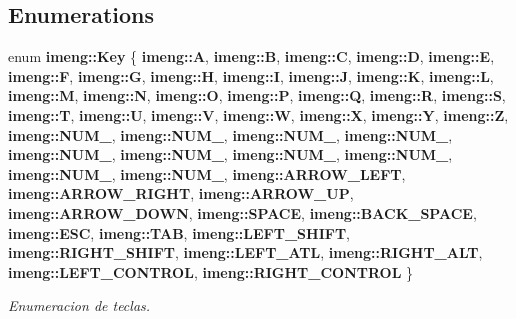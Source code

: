 \subsection*{Enumerations}
\begin{DoxyCompactItemize}
\item 
enum \textbf{ imeng\+::\+Key} \{ \newline
\textbf{ imeng\+::A}, 
\textbf{ imeng\+::B}, 
\textbf{ imeng\+::C}, 
\textbf{ imeng\+::D}, 
\newline
\textbf{ imeng\+::E}, 
\textbf{ imeng\+::F}, 
\textbf{ imeng\+::G}, 
\textbf{ imeng\+::H}, 
\newline
\textbf{ imeng\+::I}, 
\textbf{ imeng\+::J}, 
\textbf{ imeng\+::K}, 
\textbf{ imeng\+::L}, 
\newline
\textbf{ imeng\+::M}, 
\textbf{ imeng\+::N}, 
\textbf{ imeng\+::O}, 
\textbf{ imeng\+::P}, 
\newline
\textbf{ imeng\+::Q}, 
\textbf{ imeng\+::R}, 
\textbf{ imeng\+::S}, 
\textbf{ imeng\+::T}, 
\newline
\textbf{ imeng\+::U}, 
\textbf{ imeng\+::V}, 
\textbf{ imeng\+::W}, 
\textbf{ imeng\+::X}, 
\newline
\textbf{ imeng\+::Y}, 
\textbf{ imeng\+::Z}, 
\textbf{ imeng\+::\+N\+U\+M\+\_}, 
\textbf{ imeng\+::\+N\+U\+M\+\_}, 
\newline
\textbf{ imeng\+::\+N\+U\+M\+\_}, 
\textbf{ imeng\+::\+N\+U\+M\+\_}, 
\textbf{ imeng\+::\+N\+U\+M\+\_}, 
\textbf{ imeng\+::\+N\+U\+M\+\_}, 
\newline
\textbf{ imeng\+::\+N\+U\+M\+\_}, 
\textbf{ imeng\+::\+N\+U\+M\+\_}, 
\textbf{ imeng\+::\+N\+U\+M\+\_}, 
\textbf{ imeng\+::\+N\+U\+M\+\_}, 
\newline
\textbf{ imeng\+::\+A\+R\+R\+O\+W\+\_\+\+L\+E\+FT}, 
\textbf{ imeng\+::\+A\+R\+R\+O\+W\+\_\+\+R\+I\+G\+HT}, 
\textbf{ imeng\+::\+A\+R\+R\+O\+W\+\_\+\+UP}, 
\textbf{ imeng\+::\+A\+R\+R\+O\+W\+\_\+\+D\+O\+WN}, 
\newline
\textbf{ imeng\+::\+S\+P\+A\+CE}, 
\textbf{ imeng\+::\+B\+A\+C\+K\+\_\+\+S\+P\+A\+CE}, 
\textbf{ imeng\+::\+E\+SC}, 
\textbf{ imeng\+::\+T\+AB}, 
\newline
\textbf{ imeng\+::\+L\+E\+F\+T\+\_\+\+S\+H\+I\+FT}, 
\textbf{ imeng\+::\+R\+I\+G\+H\+T\+\_\+\+S\+H\+I\+FT}, 
\textbf{ imeng\+::\+L\+E\+F\+T\+\_\+\+A\+TL}, 
\textbf{ imeng\+::\+R\+I\+G\+H\+T\+\_\+\+A\+LT}, 
\newline
\textbf{ imeng\+::\+L\+E\+F\+T\+\_\+\+C\+O\+N\+T\+R\+OL}, 
\textbf{ imeng\+::\+R\+I\+G\+H\+T\+\_\+\+C\+O\+N\+T\+R\+OL}
 \}
\begin{DoxyCompactList}\small\item\em Enumeracion de teclas. \end{DoxyCompactList}\end{DoxyCompactItemize}


